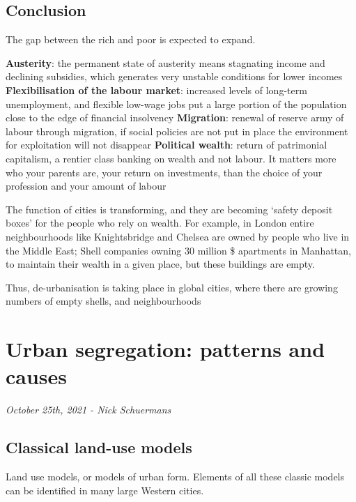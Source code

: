 \documentclass{article}
\begin{document}
\subsection{Conclusion}

The gap between the rich and poor is expected to expand. 

\begin{outline}
	\1 \textbf{Austerity}: the permanent state of austerity means stagnating income and declining subsidies, which generates very unstable conditions for lower incomes
	\1 \textbf{Flexibilisation of the labour market}: increased levels of long-term unemployment, and flexible low-wage jobs put a large portion of the population close to the edge of financial insolvency
	\1 \textbf{Migration}: renewal of reserve army of labour through migration, if social policies are not put in place the environment for exploitation will not disappear
	\1 \textbf{Political wealth}: return of patrimonial capitalism, a rentier class banking on wealth and not labour. It matters more who your parents are, your return on investments, than the choice of your profession and your amount of labour
\end{outline}

The function of cities is transforming, and they are becoming `safety deposit boxes' for the people who rely on wealth. For example, in London entire neighbourhoods like Knightsbridge and Chelsea are owned by people who live in the Middle East; Shell companies owning 30 million \$ apartments in Manhattan, to maintain their wealth in a given place, but these buildings are empty.

Thus, de-urbanisation is taking place in global cities, where there are growing numbers of empty shells, and neighbourhoods


\section{Urban segregation: patterns and causes}

\textit{October 25th, 2021 - Nick Schuermans}

\subsection{Classical land-use models}

Land use models, or models of urban form. Elements of all these classic models can be identified in many large Western cities.
\end{document}
